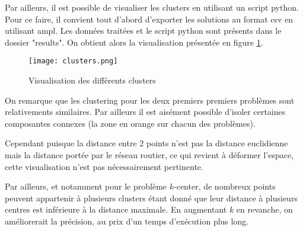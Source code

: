 \documentclass[12pt,a4paper]{article}
\begin{document}
\bigskip

Par ailleurs, il est possible de visualiser les clusters en utilisant un script python. Pour ce faire, il convient tout d'abord d'exporter les solutions au format csv en utilisant ampl. Les données traitées et le script python sont présents dans le dossier "results". On obtient alors la visualisation présentée en figure \ref{fig:res}.

\begin{figure}[!ht]
\begin{center}
\texttt{[image: clusters.png]}
\caption{Visualisation des différents clusters}
\label{fig:res}
\end{center}
\end{figure}

On remarque que les clustering pour les deux premiers premiers problèmes sont relativements similaires. Par ailleurs il est aisément possible d'isoler certaines composantes connexes (la zone en orange sur chacun des problèmes).

Cependant puisque la distance entre $2$ points n'est pas la distance euclidienne mais la distance portée par le réseau routier, ce qui revient à déformer l'espace, cette visualisation n'est pas nécessairement pertinente.

Par ailleurs, et notamment pour le problème $k$-center, de nombreux points peuvent appartenir à plusieurs clusters étant donné que leur distance à plusieurs centres est inférieure à la distance maximale. En augmentant $k$ en revanche, on améliorerait la précision, au prix d'un temps d'exécution plus long.
\end{document}
